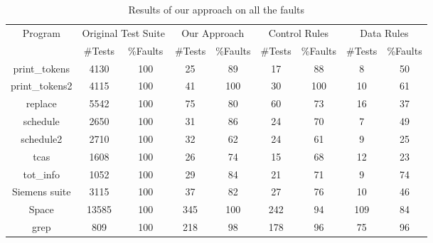 \documentclass{sig-alternate}
\begin{document}
\begin{table}[htbp]
\caption{Results of our approach on all the faults}\label{tab:our}
\center
\begin{tabular}{|c|c|c|c|c|c|c|c|c|}
\hline Program   & \multicolumn{2}{c}{Original Test Suite} \vline & \multicolumn{2}{c}{Our Approach} \vline
& \multicolumn{2}{c}{Control Rules} \vline & \multicolumn{2}{c}{Data Rules} \vline   \\

\cline{2-9}   & \#Tests &   \%Faults & \#Tests &   \%Faults &
\#Tests &   \%Faults & \#Tests &   \%Faults \\
\hline  print\_tokens   &   4130    &   100 &   25  &   89  &   17  &   88  &   8   &   50  \\
\hline  print\_tokens2  &   4115    &   100 &   41  &   100 &   30  &   100 &   10  &   61  \\
\hline  replace &   5542    &   100 &   75  &   80  &   60  &   73  &   16  &   37  \\
\hline  schedule    &   2650    &   100 &   31  &   86  &   24  &   70  &   7   &   49  \\
\hline  schedule2   &   2710    &   100 &   32  &   62  &   24  &   61  &   9   &   25  \\
\hline  tcas    &   1608    &   100 &   26  &   74  &   15  &   68  &   12  &   23  \\
\hline  tot\_info &   1052    &   100 &   29  &   84  &   21  &   71  &   9   &   74  \\
\hline  Siemens suite   &   3115    &   100 &   37  &   82  &   27  &   76  &   10  &   46  \\
\hline  Space   &   13585   &   100 &   345 &   100 &   242 &   94  &   109 &   84  \\
\hline  grep    &   809 &   100 &   218 &   98  &   178 &   96  &   75  &   96  \\

\hline
\end{tabular}
\end{table}
\end{document}
